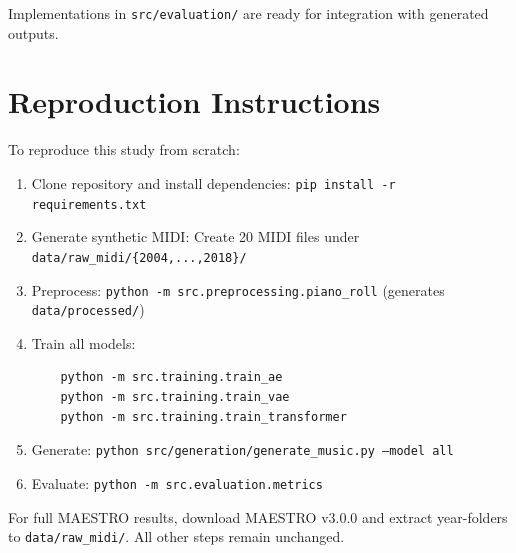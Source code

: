 Implementations in \texttt{src/evaluation/} are ready for integration with generated outputs.

\section{Reproduction Instructions}

To reproduce this study from scratch:

\begin{enumerate}
    \item Clone repository and install dependencies: \texttt{pip install -r requirements.txt}
    
    \item Generate synthetic MIDI: Create 20 MIDI files under \texttt{data/raw\_midi/\{2004,...,2018\}/}
    
    \item Preprocess: \texttt{python -m src.preprocessing.piano\_roll} (generates \texttt{data/processed/})
    
    \item Train all models:
    \begin{verbatim}
    python -m src.training.train_ae
    python -m src.training.train_vae
    python -m src.training.train_transformer
    \end{verbatim}
    
    \item Generate: \texttt{python src/generation/generate\_music.py --model all}
    
    \item Evaluate: \texttt{python -m src.evaluation.metrics}
\end{enumerate}

For full MAESTRO results, download MAESTRO v3.0.0 and extract year-folders to \texttt{data/raw\_midi/}. All other steps remain unchanged.
